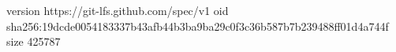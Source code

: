 version https://git-lfs.github.com/spec/v1
oid sha256:19dcde0054183337b43afb44b3ba9ba29c0f3c36b587b7b239488ff01d4a744f
size 425787
